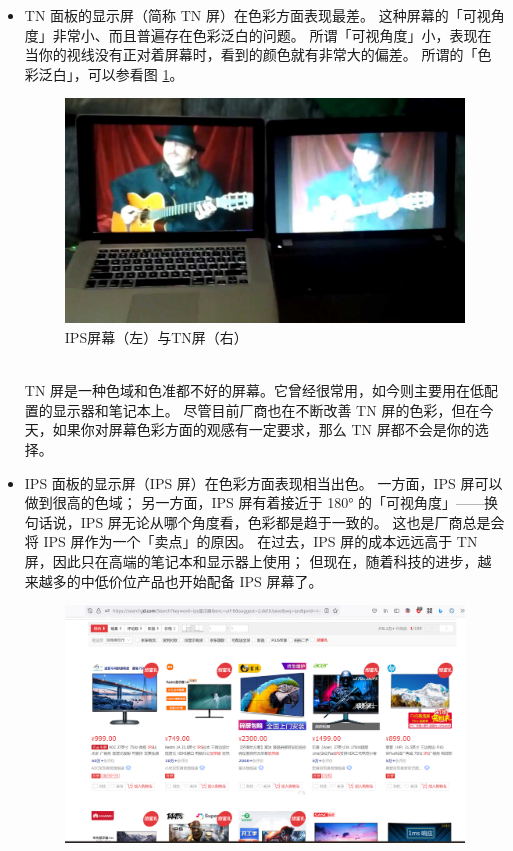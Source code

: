 \begin{itemize}
  \item TN 面板的显示屏（简称 TN 屏）在色彩方面表现最差。
    这种屏幕的「可视角度」非常小、而且普遍存在色彩泛白的问题。
    所谓「可视角度」小，表现在当你的视线没有正对着屏幕时，看到的颜色就有非常大的偏差。
    所谓的「色彩泛白」，可以参看图 \ref{IPS_vs_TN}。
    \begin{figure}[htb!]
      \centering
      \includegraphics[width=11cm]{assets/IPS_vs_TN.png}
      \caption{IPS屏幕（左）与TN屏（右）}
      \label{IPS_vs_TN}
    \end{figure}\\
    TN 屏是一种色域和色准都不好的屏幕。它曾经很常用，如今则主要用在低配置的显示器和笔记本上。
    尽管目前厂商也在不断改善 TN 屏的色彩，但在今天，如果你对屏幕色彩方面的观感有一定要求，那么 TN 屏都不会是你的选择。
  \item IPS 面板的显示屏（IPS 屏）在色彩方面表现相当出色。
    一方面，IPS 屏可以做到很高的色域；
    另一方面，IPS 屏有着接近于 180° 的「可视角度」——换句话说，IPS 屏无论从哪个角度看，色彩都是趋于一致的。
    这也是厂商总是会将 IPS 屏作为一个「卖点」的原因。
    在过去，IPS 屏的成本远远高于 TN 屏，因此只在高端的笔记本和显示器上使用；
    但现在，随着科技的进步，越来越多的中低价位产品也开始配备 IPS 屏幕了。
    \begin{figure}[htb!]
      \centering
      \includegraphics[width=13cm]{assets/IPS_at_Low_Price.png}

\end{figure}
\end{itemize}

